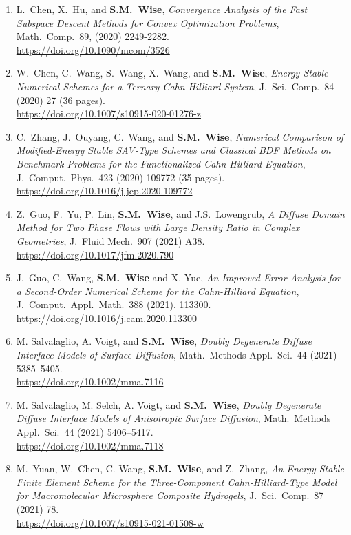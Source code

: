 \documentclass[11pt]{letter}
\begin{document}
\begin{enumerate}
	\item
L.~Chen, X.~Hu, and \textbf{S.M.~Wise}, {\sl Convergence Analysis of the Fast Subspace Descent Methods for Convex Optimization Problems}, Math.~Comp.~89, (2020) 2249-2282.
	\\ 
\url{https://doi.org/10.1090/mcom/3526}

	\item
W.~Chen, C.~Wang, S.~Wang, X.~Wang, and \textbf{S.M.~Wise}, {\sl Energy Stable Numerical Schemes for a Ternary Cahn-Hilliard System}, J.~Sci.~Comp.~84 (2020) 27 (36 pages).
	\\ 
\url{https://doi.org/10.1007/s10915-020-01276-z}

	\item
C.~Zhang, J.~Ouyang, C.~Wang, and \textbf{S.M.~Wise}, {\sl Numerical Comparison of Modified-Energy Stable SAV-Type Schemes and Classical BDF Methods on Benchmark Problems for the Functionalized Cahn-Hilliard Equation}, J.~Comput.~Phys.~423 (2020) 109772 (35 pages).
	\\ 
\url{https://doi.org/10.1016/j.jcp.2020.109772}

	\item
Z.~Guo, F.~Yu,  P.~Lin, \textbf{S.M.~Wise}, and J.S.~Lowengrub, {\sl A Diffuse Domain Method for Two Phase Flows with Large Density Ratio in Complex Geometries}, J.~Fluid Mech.~907 (2021) A38.
	\\
\url{https://doi.org/10.1017/jfm.2020.790}

	\item
J.~Guo, C.~Wang, \textbf{S.M.~Wise} and X. Yue, {\sl An Improved Error Analysis for a Second-Order Numerical Scheme for the Cahn-Hilliard Equation}, J.~Comput.~Appl.~Math.~388 (2021). 113300.
	\\
\url{https://doi.org/10.1016/j.cam.2020.113300}

	\item
M. Salvalaglio, A. Voigt, and \textbf{S.M.~Wise}, {\sl Doubly Degenerate Diffuse Interface Models of Surface Diffusion}, Math.~Methods Appl.~Sci.~44 (2021) 5385--5405.
	\\
\url{https://doi.org/10.1002/mma.7116}

	\item
M. Salvalaglio, M. Selch, A. Voigt, and \textbf{S.M.~Wise}, {\sl Doubly Degenerate Diffuse Interface Models of Anisotropic Surface Diffusion}, Math.~Methods Appl.~Sci.~44 (2021) 5406--5417.
	\\
\url{https://doi.org/10.1002/mma.7118}

	\item
M.~Yuan, W.~Chen, C. Wang, \textbf{S.M.~Wise}, and Z.~Zhang, {\sl An Energy Stable Finite Element Scheme for the Three-Component Cahn-Hilliard-Type Model for Macromolecular Microsphere Composite Hydrogels}, J.~Sci.~Comp.~87 (2021) 78.
	\\ 
\url{https://doi.org/10.1007/s10915-021-01508-w}


\end{enumerate}
\end{document}
